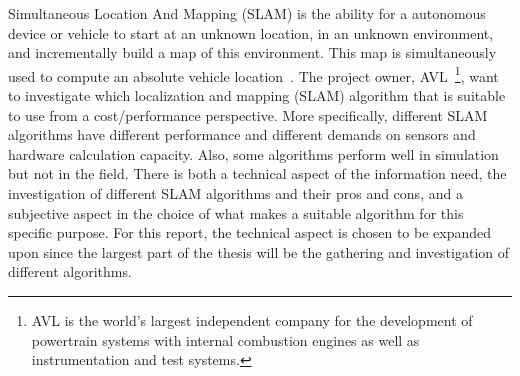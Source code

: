 Simultaneous Location And Mapping (SLAM) is the ability for a autonomous
device or vehicle to start at an unknown location, in an unknown environment,
and incrementally build a map of this environment. This map is simultaneously
used to compute an absolute vehicle location~\cite{938381}. The project owner,
AVL~\footnote{AVL is the world's largest independent company for the
development of powertrain systems with internal combustion engines as well as
instrumentation and test systems.}, want to investigate which localization and
mapping (SLAM) algorithm that is suitable to use from a cost/performance
perspective. More specifically, different SLAM algorithms have different
performance and different demands on sensors and hardware calculation capacity.
Also, some algorithms perform well in simulation but not in the field.  There is
both a technical aspect of the information need, the investigation of different
SLAM algorithms and their pros and cons, and a subjective aspect in the choice
of what makes a suitable algorithm for this specific purpose. For this report,
the technical aspect is chosen to be expanded upon since the largest part of
the thesis will be the gathering and investigation of different algorithms.
